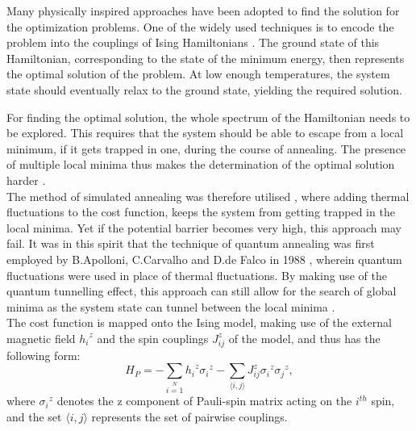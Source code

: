 \documentclass[../main.tex]{subfiles}
\begin{document}
Many physically inspired approaches have been adopted to find the solution for the optimization problems. One of the widely used techniques is to encode the problem into the couplings of Ising Hamiltonians \cite{hormozi2017nonstoquastic}. The ground state of this Hamiltonian, corresponding to the state of the minimum energy, then represents the optimal solution of the problem. At low enough temperatures, the system state should eventually relax to the ground state, yielding the required solution.

For finding the optimal solution, the whole spectrum of the Hamiltonian needs to be explored. This requires that the system should be able to escape from a local minimum, if it gets trapped in one, during the course of annealing. The presence of multiple local minima thus makes the determination of the optimal solution harder \cite{santoro2006optimization}.\\
 
The method of simulated annealing was therefore utilised \cite{kirkpatrick1983optimization}, where adding thermal fluctuations to the cost function, keeps the system from getting trapped in the local minima. Yet if the potential barrier becomes very high, this approach may fail. It was in this spirit that the technique of quantum annealing was first employed by B.Apolloni, C.Carvalho and D.de Falco in 1988 \cite{apolloni1989quantum}, wherein quantum fluctuations were used in place of thermal fluctuations. By making use of the quantum tunnelling effect, this approach can still allow for the search of global minima as the system state can tunnel between the local minima \cite{Albash_2018}.\\
 
The cost function is mapped onto the Ising model, making use of the external magnetic field ${h_i}^z$ and the spin couplings ${J_{ij}^z}$ of the model, and thus has the following form:
\begin{equation}
H_P=-\sum\limits_{i=1}\limits^{N}{h_i}^z{\sigma_i}^z - \sum\limits_{\langle i,j \rangle}{J_{ij}^z} {\sigma_i}^z{\sigma_j}^z, \label{eq:b4}
\end{equation}
where ${\sigma_i}^z$ denotes the z component of Pauli-spin matrix acting on the $i^{th}$ spin, and the set $\langle i,j \rangle$ represents the set of pairwise couplings.
\end{document}
